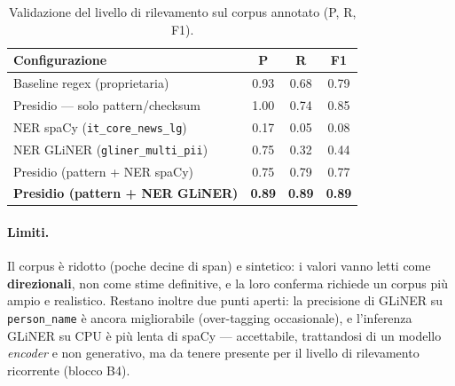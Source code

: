 \begin{table}[htbp]
	\centering
	\caption{Validazione del livello di rilevamento sul corpus annotato (P, R, F1).}
	\label{tab:test-detection}
	\small
	\begin{tabular}{|l|c|c|c|}
		\hline
		\textbf{Configurazione}                  & \textbf{P} & \textbf{R} & \textbf{F1}   \\
		\hline
		Baseline regex (proprietaria)            & 0.93       & 0.68       & 0.79          \\
		\hline
		Presidio --- solo pattern/checksum       & 1.00       & 0.74       & 0.85          \\
		\hline
		NER spaCy (\texttt{it\_core\_news\_lg})   & 0.17       & 0.05       & 0.08          \\
		\hline
		NER GLiNER (\texttt{gliner\_multi\_pii})  & 0.75       & 0.32       & 0.44          \\
		\hline
		Presidio (pattern + NER spaCy)           & 0.75       & 0.79       & 0.77          \\
		\hline
		\textbf{Presidio (pattern + NER GLiNER)} & \textbf{0.89} & \textbf{0.89} & \textbf{0.89} \\
		\hline
	\end{tabular}
\end{table}

\paragraph{Limiti.} Il corpus è ridotto (poche decine di span) e sintetico: i valori vanno letti come \textbf{direzionali}, non come stime definitive, e la loro conferma richiede un corpus più ampio e realistico. Restano inoltre due punti aperti: la precisione di GLiNER su \texttt{person\_name} è ancora migliorabile (over-tagging occasionale), e l'inferenza GLiNER su CPU è più lenta di spaCy --- accettabile, trattandosi di un modello \textit{encoder} e non generativo, ma da tenere presente per il livello di rilevamento ricorrente (blocco B4).
